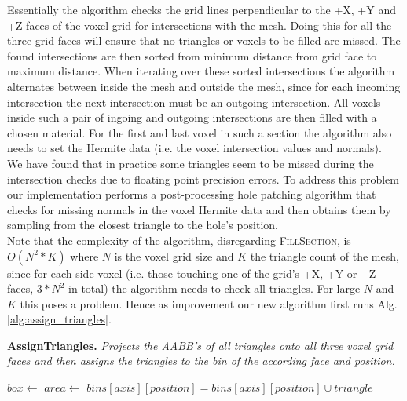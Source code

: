 Essentially the algorithm checks the grid lines perpendicular to the +X, +Y and +Z faces of the voxel grid for intersections
with the mesh. Doing this for all the three grid faces will ensure that no triangles or voxels to be filled are missed.
The found intersections are then sorted from minimum distance from grid face to maximum distance. When iterating over these
sorted intersections the algorithm alternates between inside the mesh and outside the mesh, since for each incoming intersection
the next intersection must be an outgoing intersection. All voxels inside such a pair of ingoing and outgoing intersections are
then filled with a chosen material. For the first and last voxel in such a section the algorithm also needs to set the Hermite data (i.e. the voxel intersection values and normals).\\
We have found that in practice some triangles seem to be missed during the intersection checks due to floating point precision errors. To address this problem our implementation performs a post-processing
hole patching algorithm that checks for missing normals in the voxel Hermite data and then obtains them by sampling from the closest
triangle to the hole's position.\\
Note that the complexity of the algorithm, disregarding \textsc{FillSection}, is $O(N^2 * K)$ where $N$ is the voxel grid
size and $K$ the triangle count of the mesh, since for each side voxel (i.e. those touching one of the grid's +X, +Y or +Z faces, $3*N^2$ in total) the algorithm needs to check all triangles. For large $N$ and $K$ this poses a problem. Hence as improvement our new
algorithm first runs Alg. \ref{alg:assign_triangles}.

\begin{algorithm}[H]
\caption{\textbf{AssignTriangles.} \textit{Projects the AABB's of all triangles onto all three voxel grid faces and then
assigns the triangles to the bin of the according face and position.}}\label{alg:assign_triangles}
\begin{algorithmic}[1]
			\State $box \gets$ 
			\State $area \gets$ 
				\State $bins[axis][position] = bins[axis][position] \cup triangle$
			\EndFor
		\EndFor
	\EndFor
\EndProcedure
\end{algorithmic}
\end{algorithm}

